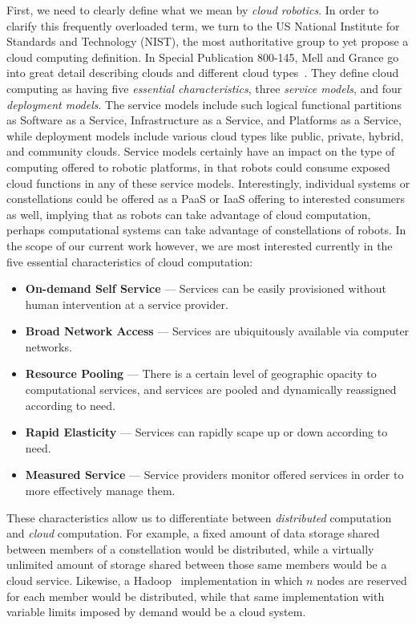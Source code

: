 \documentclass{sig-alternate}
\begin{document}
First, we need to clearly define what we mean by {\sl cloud robotics}.  In order to clarify this frequently overloaded term, we turn to the US National Institute for Standards and Technology (NIST), the most authoritative group to yet propose a cloud computing definition.  In Special Publication 800-145, Mell and Grance go into great detail describing clouds and different cloud types~\cite{NIST-SP-800-145}. They define cloud computing as having five {\sl essential characteristics}, three {\sl service models}, and four {\sl deployment models}.  The service models include such logical functional partitions as Software as a Service, Infrastructure as a Service, and Platforms as a Service, while deployment models include various cloud types like public, private, hybrid, and community clouds.  Service models certainly have an impact on the type of computing offered to robotic platforms, in that robots could consume exposed cloud functions in any of these service models.  Interestingly, individual systems or constellations could be offered as a PaaS or IaaS offering to interested consumers as well, implying that as robots can take advantage of cloud computation, perhaps computational systems can take advantage of constellations of robots.  In the scope of our current work however, we are most interested currently in the five essential characteristics of cloud computation:

\begin{itemize}
\item {\bf On-demand Self Service} --- Services can be easily provisioned without human intervention at a service provider.
\item {\bf Broad Network Access} --- Services are ubiquitously available via computer networks.
\item {\bf Resource Pooling} --- There is a certain level of geographic opacity to computational services, and services are pooled and dynamically reassigned according to need.
\item {\bf Rapid Elasticity} --- Services can rapidly scape up or down according to need.
\item {\bf Measured Service} --- Service providers monitor offered services in order to more effectively manage them.
\end{itemize}

These characteristics allow us to differentiate between {\sl distributed} computation and {\sl cloud} computation.  For example, a fixed amount of data storage shared between members of a constellation would be distributed, while a virtually unlimited amount of storage shared between those same members would be a cloud service.  Likewise, a Hadoop~\cite{Hadoop} implementation in which $n$ nodes are reserved for each member would be distributed, while that same implementation with variable limits imposed by demand would be a cloud system.
\end{document}
